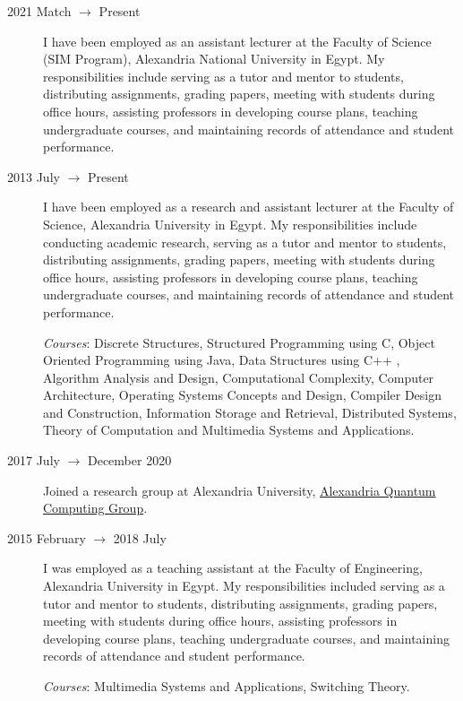 \documentclass[margin,line]{resume}
\begin{document}
\begin{resume}
\begin{description}
        \item[2021 Match $\rightarrow$ Present] I have been employed as an assistant lecturer at the Faculty of Science (SIM Program), Alexandria National University in Egypt. My responsibilities include serving as a tutor and mentor to students, distributing assignments, grading papers, meeting with students during office hours, assisting professors in developing course plans, teaching undergraduate courses, and maintaining records of attendance and student performance.

		\item[2013 July $\rightarrow$ Present]  I have been employed as a research and assistant lecturer at the Faculty of Science, Alexandria University in Egypt. My responsibilities include conducting academic research, serving as a tutor and mentor to students, distributing assignments, grading papers, meeting with students during office hours, assisting professors in developing course plans, teaching undergraduate courses, and maintaining records of attendance and student performance.

			\emph{Courses}: Discrete Structures, Structured Programming using C, Object Oriented Programming using Java, Data Structures using C++ , Algorithm Analysis and Design, Computational Complexity, Computer Architecture, Operating Systems Concepts and Design, Compiler Design and Construction, Information Storage and Retrieval, Distributed Systems, Theory of Computation and Multimedia Systems and Applications.


		\item[2017 July $\rightarrow$ December 2020 ]  Joined a research group at Alexandria University, \href{http://www.sci.p.alexu.edu.eg/~aleqcg/index.html}{Alexandria Quantum Computing Group}.




		\item[2015 February $\rightarrow$ 2018 July]  I was employed as a teaching assistant at the Faculty of Engineering, Alexandria University in Egypt. My responsibilities included serving as a tutor and mentor to students, distributing assignments, grading papers, meeting with students during office hours, assisting professors in developing course plans, teaching undergraduate courses, and maintaining records of attendance and student performance.

			\emph{Courses}: Multimedia Systems and Applications, Switching Theory.

	\end{description}




\end{resume}
\end{document}

